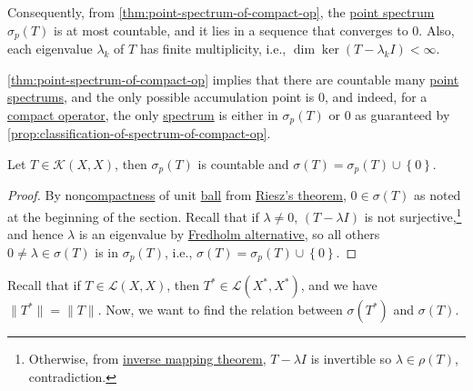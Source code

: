 \begin{remark}
	Consequently, from \autoref{thm:point-spectrum-of-compact-op}, the \hyperref[def:point-spectrum]{point spectrum} \(\sigma _p(T)\) is at most countable, and it lies in a sequence that converges to \(0\). Also, each eigenvalue \(\lambda _k\) of \(T\) has finite multiplicity, i.e., \(\dim \ker (T-\lambda _k I) < \infty \).
\end{remark}

\autoref{thm:point-spectrum-of-compact-op} implies that there are countable many \hyperref[def:point-spectrum]{point spectrums}, and the only possible accumulation point is \(0\), and indeed, for a \hyperref[def:compact-op]{compact operator}, the only \hyperref[def:spectrum-point]{spectrum} is either in \(\sigma _p(T)\) or \(0\) as guaranteed by \autoref{prop:classification-of-spectrum-of-compact-op}.

\begin{proposition}\label{prop:classification-of-spectrum-of-compact-op}
	Let \(T\in \mathcal{K} (X, X)\), then \(\sigma _p(T)\) is countable and \(\sigma (T) = \sigma _p(T) \cup \left\{ 0 \right\} \).
\end{proposition}
\begin{proof}
	By non\hyperref[def:compact]{compactness} of unit \hyperref[def:ball]{ball} from \hyperref[thm:Riesz]{Riesz's theorem}, \(0\in \sigma (T)\) as noted at the beginning of the section. Recall that if \(\lambda \neq 0\), \((T - \lambda I)\) is not surjective,\footnote{Otherwise, from \hyperref[thm:inverse-mapping]{inverse mapping theorem}, \(T-\lambda I\) is invertible so \(\lambda \in \rho (T)\), contradiction.} and hence \(\lambda \) is an eigenvalue by \hyperref[thm:Fredholm-alternative]{Fredholm alternative}, so all others \(0 \neq \lambda \in \sigma (T)\) is in \(\sigma _p(T)\), i.e., \(\sigma (T) = \sigma _p(T) \cup \left\{ 0 \right\} \).
\end{proof}

Recall that if \(T\in \mathcal{L} (X, X)\), then \(T^{\ast} \in \mathcal{L} (X^{\ast} , X^{\ast} )\), and we have \(\lVert T^{\ast}  \rVert = \lVert T \rVert \). Now, we want to find the relation between \(\sigma (T^{\ast} )\) and \(\sigma (T)\).

